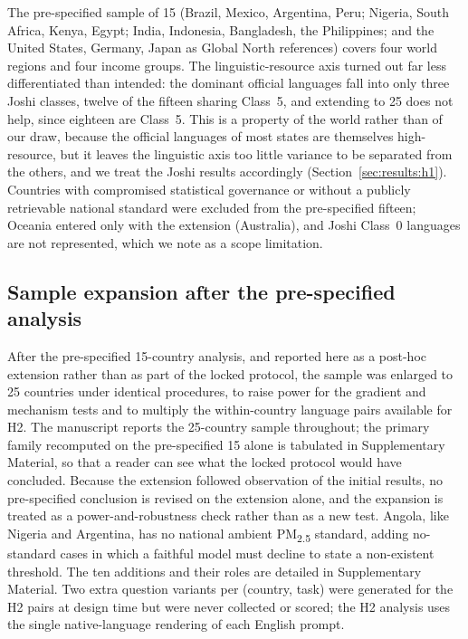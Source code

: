 The pre-specified sample of 15 (Brazil, Mexico, Argentina, Peru; Nigeria, South
Africa, Kenya, Egypt; India, Indonesia, Bangladesh, the Philippines; and the
United States, Germany, Japan as Global North references) covers four world
regions and four income groups. The linguistic-resource axis turned out far less
differentiated than intended: the dominant official languages fall into only
three Joshi classes, twelve of the fifteen sharing Class~5, and extending to 25
does not help, since eighteen are Class~5. This is a property of the world
rather than of our draw, because the official languages of most states are
themselves high-resource, but it leaves the linguistic axis too little variance
to be separated from the others, and we treat the Joshi results accordingly
(Section~\ref{sec:results:h1}). Countries with compromised statistical
governance or without a publicly retrievable national standard were excluded
from the pre-specified fifteen; Oceania entered only with the extension
(Australia), and Joshi Class~0 languages are not represented, which we note as a
scope limitation.

\subsection{Sample expansion after the pre-specified analysis}
\label{sec:expansion}

After the pre-specified 15-country analysis, and reported here as a post-hoc
extension rather than as part of the locked protocol, the sample was enlarged
to 25 countries under identical procedures, to raise power for the gradient and
mechanism tests and to multiply the within-country language pairs available for
H2. The manuscript reports the 25-country sample throughout; the primary family
recomputed on the pre-specified 15 alone is tabulated in Supplementary Material,
so that a reader can see what the locked protocol would have concluded. Because
the extension followed observation of the initial results, no pre-specified
conclusion is revised on the extension alone, and the expansion is treated as a
power-and-robustness check rather than as a new test. Angola, like Nigeria and
Argentina, has no national ambient PM\textsubscript{2.5} standard, adding
no-standard cases in which a faithful model must decline to state a non-existent
threshold. The ten additions and their roles are detailed in Supplementary
Material. Two extra question variants per (country, task) were generated for
the H2 pairs at design time but were never collected or scored; the H2 analysis
uses the single native-language rendering of each English prompt.

